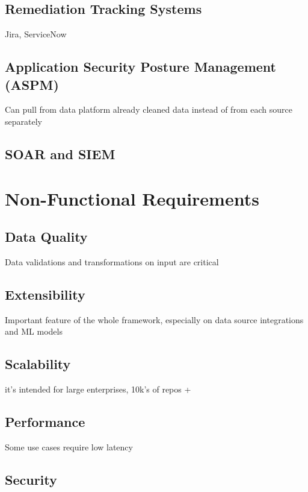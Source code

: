\subsection{Remediation Tracking Systems}

Jira, ServiceNow

\subsection{Application Security Posture Management (ASPM)}

Can pull from data platform already cleaned data instead of from each source separately

\subsection{SOAR and SIEM}



\section{Non-Functional Requirements}

\subsection{Data Quality}

Data validations and transformations on input are critical

\subsection{Extensibility}

Important feature of the whole framework, especially on data source integrations and ML models

\subsection{Scalability}

it's intended for large enterprises, 10k's of repos +

\subsection{Performance}

Some use cases require low latency

\subsection{Security}

